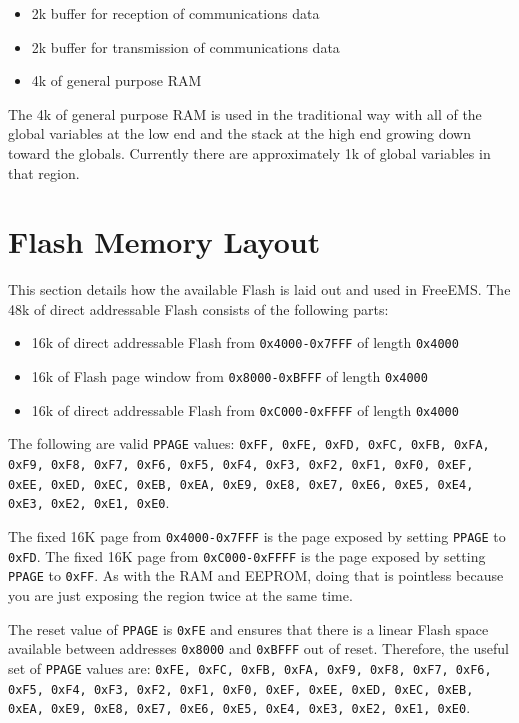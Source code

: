\documentclass[12pt,a4wide,titlepage]{article}
\begin{document}
\begin{itemize}
\item 2k buffer for reception of communications data
\item 2k buffer for transmission of communications data
\item 4k of general purpose RAM
\end{itemize}

The 4k of general purpose RAM is used in the traditional way with all of the
global variables at the low end and the stack at the high end growing down
toward the globals. Currently there are approximately 1k of global variables in
that region.



\section{Flash Memory Layout}

This section details how the available Flash is laid out and used in FreeEMS.
The 48k of direct addressable Flash consists of the following parts:

\begin{itemize}
\item 16k of direct addressable Flash from \texttt{0x4000-0x7FFF} of length \texttt{0x4000}
\item 16k of Flash page window from \texttt{0x8000-0xBFFF} of length \texttt{0x4000}
\item 16k of direct addressable Flash from \texttt{0xC000-0xFFFF} of length \texttt{0x4000}
\end{itemize}

The following are valid \texttt{PPAGE} values: \texttt{0xFF, 0xFE, 0xFD, 0xFC,
0xFB, 0xFA, 0xF9, 0xF8, 0xF7, 0xF6, 0xF5, 0xF4, 0xF3, 0xF2, 0xF1, 0xF0, 0xEF,
0xEE, 0xED, 0xEC, 0xEB, 0xEA, 0xE9, 0xE8, 0xE7, 0xE6, 0xE5, 0xE4, 0xE3, 0xE2,
0xE1, 0xE0}.

The fixed 16K page from \texttt{0x4000-0x7FFF} is the page exposed by setting
\texttt{PPAGE} to \texttt{0xFD}. The fixed 16K page from \texttt{0xC000-0xFFFF}
is the page exposed by setting \texttt{PPAGE} to \texttt{0xFF}. As with the RAM
and EEPROM, doing that is pointless because you are just exposing the region
twice at the same time.

The reset value of \texttt{PPAGE} is \texttt{0xFE} and ensures that there
is a linear Flash space available between addresses \texttt{0x8000} and
\texttt{0xBFFF} out of reset. Therefore, the useful set of \texttt{PPAGE}
values are: \texttt{0xFE, 0xFC, 0xFB, 0xFA, 0xF9, 0xF8, 0xF7, 0xF6, 0xF5, 0xF4,
0xF3, 0xF2, 0xF1, 0xF0, 0xEF, 0xEE, 0xED, 0xEC, 0xEB, 0xEA, 0xE9, 0xE8, 0xE7,
0xE6, 0xE5, 0xE4, 0xE3, 0xE2, 0xE1, 0xE0}.
\end{document}
